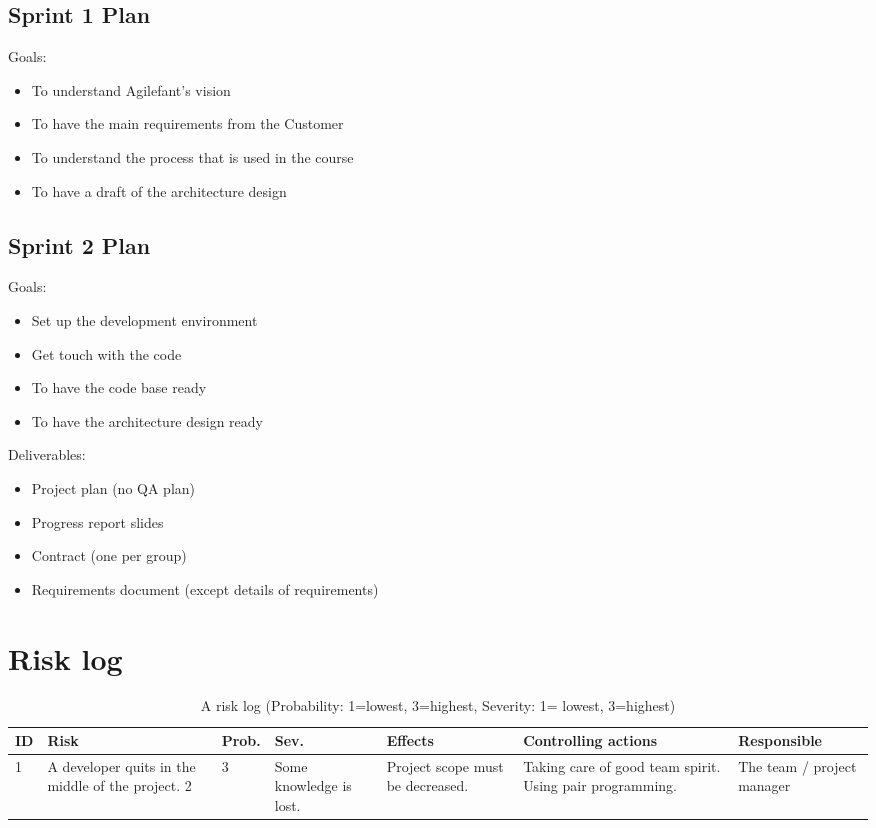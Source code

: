 \documentclass{report}
\begin{document}
\section{Sprint 1 Plan}

Goals:
\begin{itemize}
\item To understand Agilefant's vision
\item To have the main requirements from the Customer
\item To understand the process that is used in the course
\item To have a draft of the architecture design
\end{itemize}

\section{Sprint 2 Plan}

Goals:
\begin{itemize}
\item Set up the development environment
\item Get touch with the code 
\item To have the code base ready 
\item To have the architecture design ready
\end{itemize}

\noindent Deliverables:
\begin{itemize}
\item Project plan (no QA plan)
\item Progress report slides
\item Contract (one per group)
\item Requirements document (except details of requirements)
\end{itemize}

\chapter{Risk log}

\begin{table}[H]
\center
\begin{adjustwidth}{-2cm}{}
\begin{tabular}{|p{0.5cm}|p{3cm}|p{1cm}|p{1.5cm}|p{3cm}|p{3cm}|p{3cm}|} 
	
\hline %
\textbf{ID} & \textbf{Risk} & \textbf{Prob.} & \textbf{Sev.} & \textbf{Effects} & \textbf{Controlling actions} & \textbf{Responsible} \\ 
\hline
1 &
A developer quits in the middle of the project.
2 &
3 &
Some knowledge is lost. &
Project scope must be decreased. &
Taking care of good team spirit.
Using pair programming. &
The team / project manager \\
\hline
\end{tabular} 
\caption{A risk log (Probability: 1=lowest, 3=highest, Severity: 1= lowest, 3=highest)}
\label{table:Risklog}
\end{adjustwidth}
\end{table}
\end{document}
